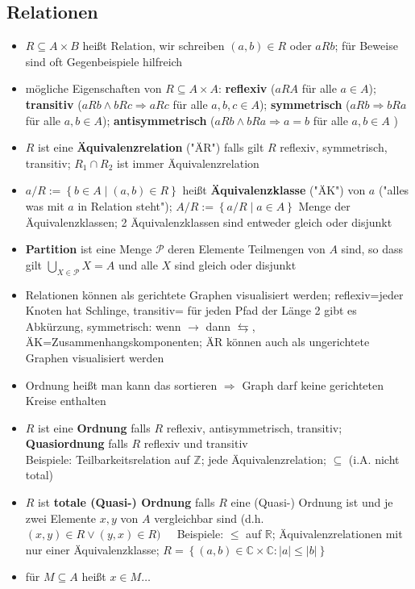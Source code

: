 \documentclass[10pt,a4paper]{article}
\begin{document}
\subsection{Relationen}
\begin{itemize}
\item $R\subseteq A\times B$ heißt Relation, wir schreiben $(a,b) \in R$ oder $aRb$; für Beweise sind oft Gegenbeispiele hilfreich
\item mögliche Eigenschaften von $R\subseteq A\times A$: \textbf{reflexiv} ($aRA$ für alle $a\in A$); \textbf{transitiv} ($aRb\land bRc \Rightarrow aRc$ für alle $a,b,c\in A$); \textbf{symmetrisch} ($aRb\Rightarrow bRa$ für alle $a,b \in A$); \textbf{antisymmetrisch} ($aRb\land bRa \Rightarrow a=b$ für alle $a,b\in A$ )
\item $R$ ist eine \textbf{Äquivalenzrelation} ("ÄR") falls gilt $R$ reflexiv, symmetrisch, transitiv; $R_{1}\cap R_{2}$ ist immer Äquivalenzrelation 
\item $a/R:=\left\lbrace b\in A\mid (a,b) \in R\right\rbrace$ heißt \textbf{Äquivalenzklasse} ("ÄK") von $a$ ("alles was mit $a$ in Relation steht"); $A/R:=\left\lbrace a/R\mid a\in A\right\rbrace$ Menge der Äquivalenzklassen;
2 Äquivalenzklassen sind entweder gleich oder disjunkt
\item \textbf{Partition} ist eine Menge $\mathcal{P}$ deren Elemente Teilmengen von $A$ sind, so dass gilt $\bigcup_{X\in \mathcal{P}} X=A$ und alle $X$ sind gleich oder disjunkt
\item Relationen können als gerichtete Graphen visualisiert werden; reflexiv=jeder Knoten hat Schlinge, transitiv= für jeden Pfad der Länge 2 gibt es Abkürzung, symmetrisch: wenn $\rightarrow$ dann $\leftrightarrows$, ÄK=Zusammenhangskomponenten; ÄR können auch als ungerichtete Graphen visualisiert werden 
\item Ordnung heißt man kann das sortieren $\Rightarrow$ Graph darf keine gerichteten Kreise enthalten


\item $R$ ist eine \textbf{Ordnung} falls $R$ reflexiv, antisymmetrisch, transitiv; \textbf{Quasiordnung} falls $R$ reflexiv und transitiv\\
Beispiele: Teilbarkeitsrelation auf $\mathbb{Z}$; jede Äquivalenzrelation; $\subseteq$ (i.A. nicht total)
\item $R$ ist \textbf{totale (Quasi-) Ordnung} falls $R$ eine (Quasi-) Ordnung ist und je zwei Elemente $x,y$ von $A$ vergleichbar sind (d.h. $(x,y)\in R\lor (y,x)\in R)\;\;\;\;$ Beispiele: $\leq$ auf $\mathbb{R}$; Äquivalenzrelationen mit nur einer Äquivalenzklasse; $R=\left\lbrace (a,b) \in \mathbb{C}\times \mathbb{C}: \vert a\vert \leq \vert b \vert \right\rbrace$ 
\item für $M\subseteq A$ heißt $x\in M\dotsc$ 


\end{itemize}
\end{document}
